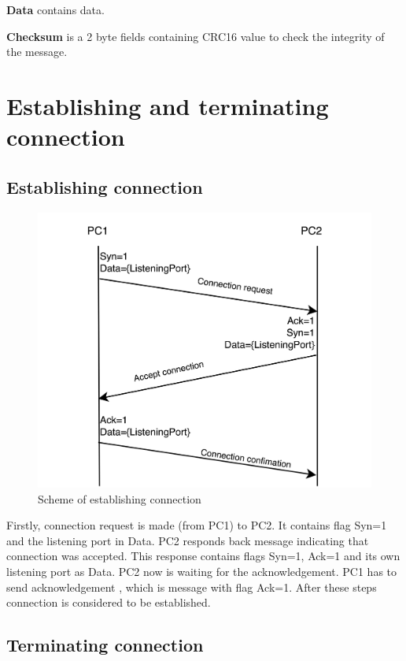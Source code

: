 \documentclass{article}
\begin{document}
\textbf{Data} contains data.

\textbf{Checksum} is a 2 byte fields containing CRC16 value to check the integrity of the message.

\section{Establishing and terminating connection}

\subsection{Establishing connection}
\begin{figure}[h]
    \centering
    \includegraphics[width=\textwidth]{images/connection.png}
    \caption{Scheme of establishing connection}
    \label{fig:mesh1}
\end{figure}
Firstly, connection request is made (from PC1) to PC2. It contains flag Syn=1 and the listening port in Data.
\newline
PC2 responds back message indicating that  connection was accepted. This response contains flags Syn=1, Ack=1 and its own listening port as Data. PC2 now is waiting for the acknowledgement.
\newline
PC1 has to send acknowledgement , which is message with flag Ack=1.
\newline
After these steps connection is considered to be established.

\subsection{Terminating connection}
\end{document}
